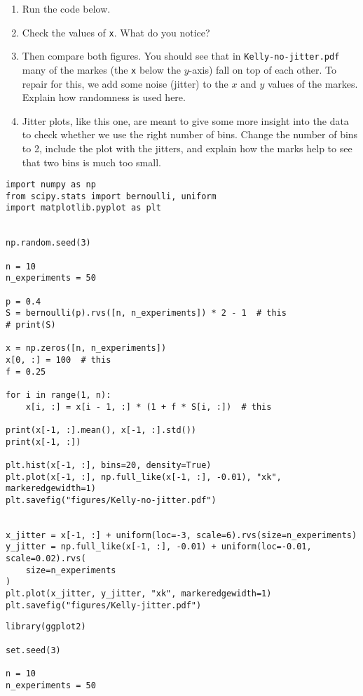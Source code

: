\begin{exercise}
\begin{enumerate}
\item Run the code below.
\item Check the values of \texttt{x}. What do you notice?
\item Then compare both figures. You should see that in \texttt{Kelly-no-jitter.pdf} many of the markes (the \texttt{x} below the $y$-axis)
fall on top of each other.  To repair for this, we add some noise (jitter) to the $x$ and $y$ values of the markes. Explain how randomness is used here.
\item  Jitter plots, like this one, are meant to give some more insight into the data to check whether we use the right number of bins. Change the number of bins to 2, include the plot with the jitters, and explain how the marks help to see that two bins is much too small.
\end{enumerate}


\begin{verbatim}
import numpy as np
from scipy.stats import bernoulli, uniform
import matplotlib.pyplot as plt


np.random.seed(3)

n = 10
n_experiments = 50

p = 0.4
S = bernoulli(p).rvs([n, n_experiments]) * 2 - 1  # this
# print(S)

x = np.zeros([n, n_experiments])
x[0, :] = 100  # this
f = 0.25

for i in range(1, n):
    x[i, :] = x[i - 1, :] * (1 + f * S[i, :])  # this

print(x[-1, :].mean(), x[-1, :].std())
print(x[-1, :])

plt.hist(x[-1, :], bins=20, density=True)
plt.plot(x[-1, :], np.full_like(x[-1, :], -0.01), "xk", markeredgewidth=1)
plt.savefig("figures/Kelly-no-jitter.pdf")


x_jitter = x[-1, :] + uniform(loc=-3, scale=6).rvs(size=n_experiments)
y_jitter = np.full_like(x[-1, :], -0.01) + uniform(loc=-0.01, scale=0.02).rvs(
    size=n_experiments
)
plt.plot(x_jitter, y_jitter, "xk", markeredgewidth=1)
plt.savefig("figures/Kelly-jitter.pdf")

\end{verbatim}

\begin{verbatim}
library(ggplot2)

set.seed(3)

n = 10
n_experiments = 50


\end{verbatim}
\end{exercise}
